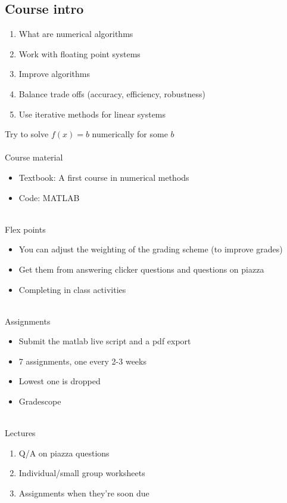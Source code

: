 \documentclass{article}
\begin{document}
\subsection{Course intro}
\begin{enumerate}
	\item What are numerical algorithms
	\item Work with floating point systems
	\item Improve algorithms
	\item Balance trade offs (accuracy, efficiency, robustness)
	\item Use iterative methods for linear systems
\end{enumerate}
Try to solve $f(x) = b$ numerically for some $b$ \\
~\\
Course material
\begin{itemize}
	\item Textbook: A first course in numerical methods
	\item Code: MATLAB
\end{itemize}
~\\
Flex points
\begin{itemize}
	\item You can adjust the weighting of the grading scheme (to improve grades) 
	\item Get them from answering clicker questions and questions on piazza
	\item Completing in class activities
\end{itemize}
~\\
Assignments
\begin{itemize}
	\item Submit the matlab live script and a pdf export
	\item 7 assignments, one every 2-3 weeks
	\item Lowest one is dropped
	\item Gradescope 
\end{itemize}
~\\
Lectures
\begin{enumerate}
	\item Q/A on piazza questions
	\item Individual/small group worksheets
	\item Assignments when they're soon due
\end{enumerate}
\end{document}
